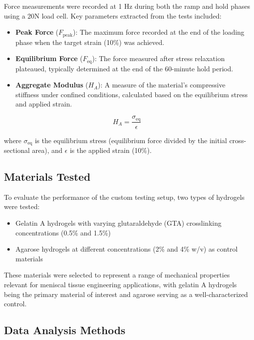 Force measurements were recorded at 1 Hz during both the ramp and hold phases using a 20N load cell. Key parameters extracted from the tests included:

\begin{itemize}
    \item \textbf{Peak Force} (\(F_{\text{peak}}\)): The maximum force recorded at the end of the loading phase when the target strain (10\%) was achieved.
    
    \item \textbf{Equilibrium Force} (\(F_{\text{eq}}\)): The force measured after stress relaxation plateaued, typically determined at the end of the 60-minute hold period.
    
    \item \textbf{Aggregate Modulus} (\(H_A\)): A measure of the material's compressive stiffness under confined conditions, calculated based on the equilibrium stress and applied strain.
\end{itemize}

\begin{equation}
    H_A = \frac{\sigma_{\text{eq}}}{\epsilon}
\end{equation}

where \(\sigma_{\text{eq}}\) is the equilibrium stress (equilibrium force divided by the initial cross-sectional area), and \(\epsilon\) is the applied strain (10\%).

\subsection{Materials Tested}

To evaluate the performance of the custom testing setup, two types of hydrogels were tested:
\begin{itemize}
    \item Gelatin A hydrogels with varying glutaraldehyde (GTA) crosslinking concentrations (0.5\% and 1.5\%)
    \item Agarose hydrogels at different concentrations (2\% and 4\% w/v) as control materials
\end{itemize}

These materials were selected to represent a range of mechanical properties relevant for meniscal tissue engineering applications, with gelatin A hydrogels being the primary material of interest and agarose serving as a well-characterized control.

\subsection{Data Analysis Methods}

